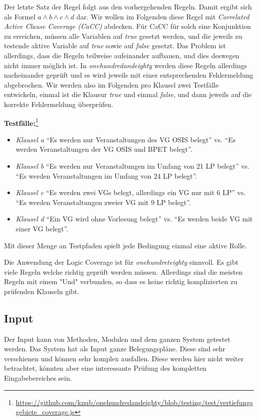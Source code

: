 \documentclass[ngerman]{article}
\begin{document}
Der letzte Satz der Regel folgt aus den vorhergehenden Regeln.
Damit ergibt sich als Formel $a \land b \land c \land d$ dar.
Wir wollen im Folgenden diese Regel mit \emph{Correlated Active Clause Coverage (CaCC)} abdecken.
Für CaCC für solch eine Konjunktion zu erreichen, müssen alle Variablen auf \emph{true} gesetzt werden, und die jeweils zu testende aktive Variable auf \emph{true} sowie auf \emph{false} gesetzt.
Das Problem ist allerdings, dass die Regeln teilweise aufeinander aufbauen, und dies deswegen nicht immer möglich ist.
In \emph{onehundredandeighty} werden diese Regeln allerdings nacheinander geprüft und es wird jeweils mit einer entsprechenden Fehlermeldung abgebrochen.
Wir werden also im Folgenden pro Klausel zwei Testfälle entwickeln, einmal ist die Klausur \emph{true} und einmal \emph{false}, und dann jeweils auf die korrekte Fehlermeldung überprüfen.

\textbf{Testfälle:}\footnote{\url{https://github.com/knub/onehundredandeighty/blob/testing/test/vertiefungsgebiete_coverage.js}} \\
\begin{itemize}
    \item \emph{Klausel a}
        ``Es werden nur Veranstaltungen des VG OSIS belegt'' vs. ``Es werden Veranstaltungen der VG OSIS und BPET belegt''.
    \item \emph{Klausel b}
        ``Es werden nur Veranstaltungen im Umfang von 21 LP belegt'' vs. ``Es werden Veranstaltungen im Umfang von 24 LP belegt''.
    \item \emph{Klausel c}
        ``Es werden zwei VGs belegt, allerdings ein VG nur mit 6 LP'' vs. ``Es werden Veranstaltungen zweier VG mit 9 LP belegt''.
    \item \emph{Klausel d}
        ``Ein VG wird ohne Vorlesung belegt'' vs. ``Es werden beide VG mit einer VG belegt''.
\end{itemize}

Mit dieser Menge an Testpfaden spielt jede Bedingung einmal eine aktive Rolle.

Die Anwendung der Logic Coverage ist für \emph{onehundreteighty} sinnvoll. Es gibt viele Regeln welche richtig geprüft werden müssen. Allerdings sind die meisten Regeln mit einem "Und" verbunden, so dass es keine richtig komplizierten zu prüfenden Klauseln gibt.

\subsection{Input}
Der Input kann von Methoden, Modulen und dem ganzen System getestet werden.
Das System hat als Input ganze Belegungspläne.
Diese sind sehr verschienen und können sehr komplex ausfallen.
Diese werden hier nicht weiter betrachtet, könnten aber eine interessante Prüfung des kompletten Eingabebereiches sein.
\end{document}
